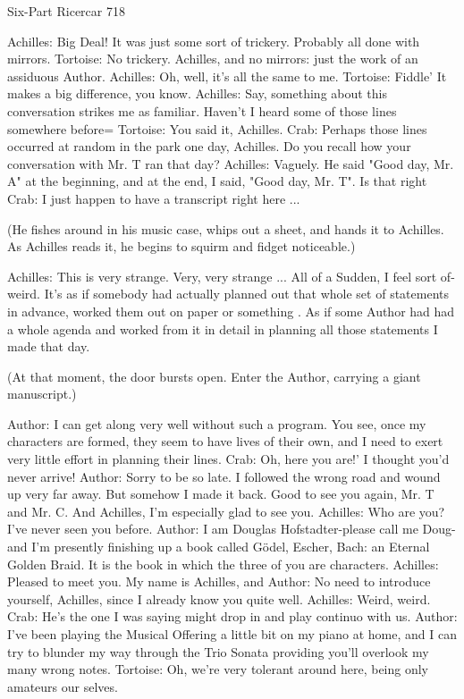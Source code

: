 Six-Part Ricercar                                                                       718

Achilles: Big Deal! It was just some sort of trickery. Probably all done with mirrors.
Tortoise: No trickery. Achilles, and no mirrors: just the work of an assiduous Author.
Achilles: Oh, well, it's all the same to me.
Tortoise: Fiddle' It makes a big difference, you know.
Achilles: Say, something about this conversation strikes me as familiar. Haven't I heard
   some of those lines somewhere before= Tortoise: You said it, Achilles.
Crab: Perhaps those lines occurred at random in the park one day, Achilles. Do you recall
   how your conversation with Mr. T ran that day?
Achilles: Vaguely. He said "Good day, Mr. A" at the beginning, and at the end, I said,
   "Good day, Mr. T". Is that right
Crab: I just happen to have a transcript right here ...

   (He fishes around in his music case, whips out a sheet, and hands it to Achilles. As
   Achilles reads it, he begins to squirm and fidget noticeable.)

Achilles: This is very strange. Very, very strange ... All of a Sudden, I feel sort of-weird.
  It's as if somebody had actually planned out that whole set of statements in advance,
  worked them out on paper or something . As if some Author had had a whole agenda
  and worked from it in detail in planning all those statements I made that day.

   (At that moment, the door bursts open. Enter the Author, carrying a giant
   manuscript.)

Author: I can get along very well without such a program. You see, once my characters
   are formed, they seem to have lives of their own, and I need to exert very little effort
   in planning their lines.
Crab: Oh, here you are!' I thought you'd never arrive!
Author: Sorry to be so late. I followed the wrong road and wound up very far away. But
   somehow I made it back. Good to see you again, Mr. T and Mr. C. And Achilles, I'm
   especially glad to see you.
Achilles: Who are you? I've never seen you before.
Author: I am Douglas Hofstadter-please call me Doug-and I'm presently finishing up a
   book called Gödel, Escher, Bach: an Eternal Golden Braid. It is the book in which
   the three of you are characters.
Achilles: Pleased to meet you. My name is Achilles, and
Author: No need to introduce yourself, Achilles, since I already know you quite well.
Achilles: Weird, weird.
Crab: He's the one I was saying might drop in and play continuo with us.
Author: I've been playing the Musical Offering a little bit on my piano at home, and I can
   try to blunder my way through the Trio Sonata providing you'll overlook my many
   wrong notes.
Tortoise: Oh, we're very tolerant around here, being only amateurs our selves.




